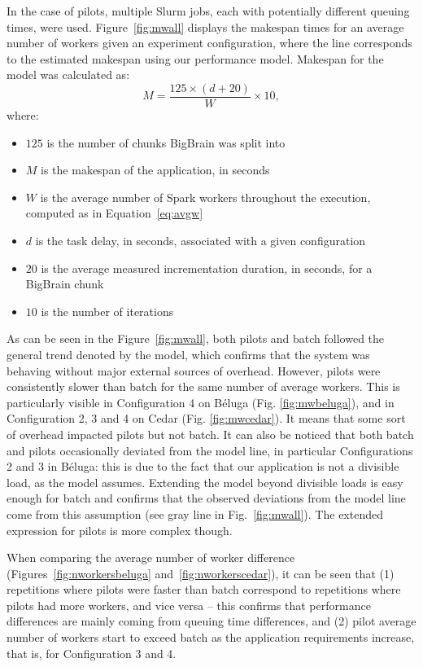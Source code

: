 \documentclass{IEEEtran}
\begin{document}
In the case of pilots, multiple Slurm jobs, each with potentially different queuing times,
were used. Figure~\ref{fig:mwall} displays the makespan times for an average number of workers
given an experiment configuration, where the line corresponds to the estimated makespan using 
our performance model. Makespan for the model was calculated as:
$$
M = \frac{125\times(d + 20)}{W}\times 10,
$$
where:
\begin{itemize}
    \item $125$ is the number of chunks BigBrain was split into
    \item $M$ is the makespan of the application, in seconds
    \item $W$ is the average number of Spark workers throughout the execution, computed as in Equation~\ref{eq:avgw}
    \item $d$ is the task delay, in seconds, associated with a given configuration
    \item $20$ is the average measured incrementation duration, in seconds, for a BigBrain chunk
    \item $10$ is the number of iterations
\end{itemize}
As can be seen in the Figure~\ref{fig:mwall}, both pilots and batch 
followed the general trend denoted by the model, which confirms that 
the system was behaving without major external sources of
overhead. However, pilots were consistently slower than batch for the same
number of average workers. This is particularly visible in Configuration 4
on B\'eluga (Fig. \ref{fig:mwbeluga}), and in Configuration 2, 3 and 4 on
Cedar (Fig. \ref{fig:mwcedar}). It means that some sort of overhead
impacted pilots but not batch. It can also be noticed that both batch and
pilots occasionally deviated from the model line, in particular
Configurations 2 and 3 in B\'eluga: this is due to the fact that our
application is not a divisible load, as the model assumes. Extending the
model beyond divisible loads is easy enough for batch and confirms that the
observed deviations from the model line come from this assumption (see gray
line in Fig.~\ref{fig:mwall}). The extended expression for pilots is more complex
though.

When
comparing the average number of worker difference
(Figures~\ref{fig:nworkersbeluga} and~\ref{fig:nworkerscedar}), it can be
seen that (1) repetitions where pilots were faster than batch correspond
to repetitions where pilots had more workers, and vice versa -- this
confirms that performance differences are mainly coming from queuing time
differences, and (2) pilot average number of workers start to exceed batch
as the application requirements increase, that is, for Configuration 3 and
4.
\end{document}
